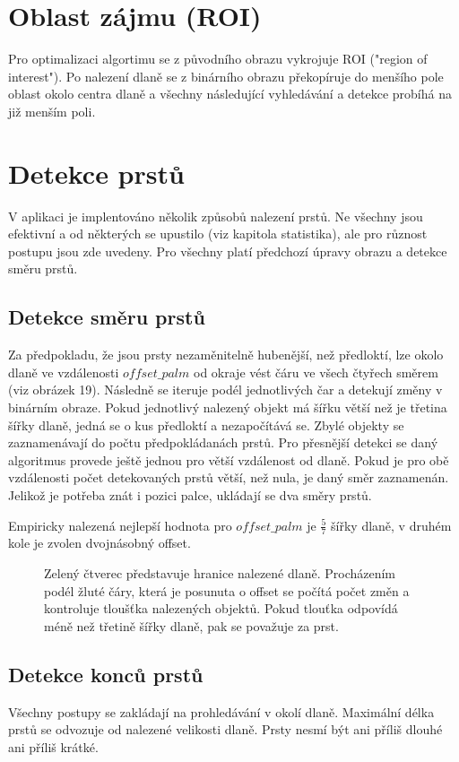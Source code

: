 \section{Oblast zájmu (ROI)}
Pro optimalizaci algortimu se z původního obrazu vykrojuje ROI ("region of interest"). Po nalezení dlaně se z binárního obrazu překopíruje do menšího pole oblast okolo centra dlaně a všechny následující vyhledávání a detekce probíhá na již menším poli. 


\section{Detekce prstů}
V aplikaci je implentováno několik způsobů nalezení prstů. Ne všechny jsou efektivní a od některých se upustilo (viz kapitola statistika), ale pro různost postupu jsou zde uvedeny. Pro všechny platí předchozí úpravy obrazu a detekce směru prstů.

\subsection{Detekce směru prstů}
Za předpokladu, že jsou prsty nezaměnitelně hubenější, než předloktí, lze okolo dlaně ve vzdálenosti $ offset\_palm $ od okraje vést čáru ve všech čtyřech směrem (viz obrázek 19). Následně se iteruje podél jednotlivých čar a detekují změny v binárním obraze. Pokud jednotlivý nalezený objekt má šířku větší než je třetina šířky dlaně, jedná se o kus předloktí a nezapočítává se. Zbylé objekty se zaznamenávají do počtu předpokládanách prstů.  Pro přesnější detekci se daný algoritmus provede ještě jednou pro větší vzdálenost od dlaně. Pokud je pro obě vzdálenosti počet detekovaných prstů větší, než nula, je daný směr zaznamenán. Jelikož je potřeba znát i pozici palce, ukládají se dva směry prstů.

Empiricky nalezená nejlepší hodnota pro $ offset\_palm $ je $ \frac{5}{7} $ šířky dlaně, v druhém kole je zvolen dvojnásobný offset. 

\begin{figure}[htp]
\centering
{}
\caption{Zelený čtverec představuje hranice nalezené dlaně. Procházením podél žluté čáry, která je posunuta o offset se počítá počet změn a kontroluje tloušťka nalezených objektů. Pokud tlouťka odpovídá méně než třetině šířky dlaně, pak se považuje za prst.}
\label{fig:whereFingers}
\end{figure}
\newpage
\subsection{Detekce konců prstů}
Všechny postupy se zakládají na prohledávání v okolí dlaně. Maximální délka prstů se odvozuje od nalezené velikosti dlaně. Prsty nesmí být ani příliš dlouhé ani příliš krátké.\\


